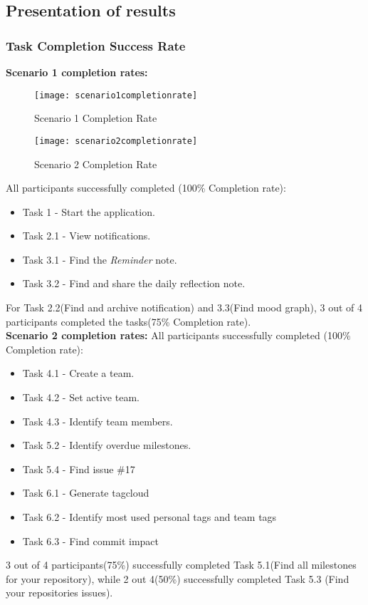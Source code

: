 \subsection{Presentation of results}
\subsubsection{Task Completion Success Rate}
\textbf{Scenario 1 completion rates:}
\begin{figure}[h!]
    \centering
        \texttt{[image: scenario1completionrate]}
    \caption{Scenario 1 Completion Rate}
    \label{scenario1completionrate}
\end{figure}
\begin{figure}[h!]
    \centering
        \texttt{[image: scenario2completionrate]}
    \caption{Scenario 2 Completion Rate}
    \label{scenario2completionrate}
\end{figure}
All participants successfully completed (100\% Completion rate):
\begin{itemize}
	\item Task 1 - Start the application. 
	\item Task 2.1 - View notifications. 
	\item Task 3.1 - Find the \emph{Reminder} note. 
	\item Task 3.2 - Find and share the daily reflection note.
\end{itemize}
For Task 2.2(Find and archive notification) and 3.3(Find mood graph), 3 out of 4 participants completed the tasks(75\% Completion rate). \\

\textbf{Scenario 2 completion rates:}
All participants successfully completed (100\% Completion rate):
\begin{itemize}
	\item Task 4.1 - Create a team. 
	\item Task 4.2 - Set active team. 
	\item Task 4.3 - Identify team members. 
	\item Task 5.2 - Identify overdue milestones. 
	\item Task 5.4 - Find issue \#17
	\item Task 6.1 - Generate tagcloud
	\item Task 6.2 - Identify most used personal tags and team tags
	\item Task 6.3 - Find commit impact
\end{itemize}
3 out of 4 participants(75\%) successfully completed Task 5.1(Find all milestones for your repository), while 2 out 4(50\%) successfully completed Task 5.3 (Find your repositories issues). 

